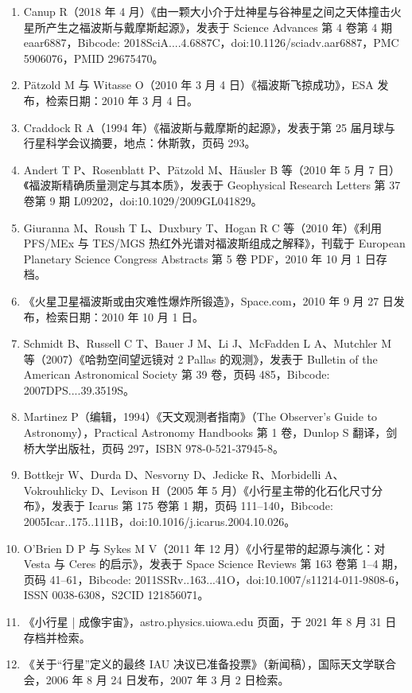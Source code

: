 \begin{enumerate}
\item Canup R（2018 年 4 月）《由一颗大小介于灶神星与谷神星之间之天体撞击火星所产生之福波斯与戴摩斯起源》，发表于 Science Advances 第 4 卷第 4 期 eaar6887，Bibcode: 2018SciA....4.6887C，doi:10.1126/sciadv.aar6887，PMC 5906076，PMID 29675470。
\item Pätzold M 与 Witasse O（2010 年 3 月 4 日）《福波斯飞掠成功》，ESA 发布，检索日期：2010 年 3 月 4 日。
\item Craddock R A（1994 年）《福波斯与戴摩斯的起源》，发表于第 25 届月球与行星科学会议摘要，地点：休斯敦，页码 293。
\item Andert T P、Rosenblatt P、Pätzold M、Häusler B 等（2010 年 5 月 7 日）《福波斯精确质量测定与其本质》，发表于 Geophysical Research Letters 第 37 卷第 9 期 L09202，doi:10.1029/2009GL041829。
\item Giuranna M、Roush T L、Duxbury T、Hogan R C 等（2010 年）《利用 PFS/MEx 与 TES/MGS 热红外光谱对福波斯组成之解释》，刊载于 European Planetary Science Congress Abstracts 第 5 卷 PDF，2010 年 10 月 1 日存档。
\item 《火星卫星福波斯或由灾难性爆炸所锻造》，Space.com，2010 年 9 月 27 日发布，检索日期：2010 年 10 月 1 日。
\item Schmidt B、Russell C T、Bauer J M、Li J、McFadden L A、Mutchler M 等（2007）《哈勃空间望远镜对 2 Pallas 的观测》，发表于 Bulletin of the American Astronomical Society 第 39 卷，页码 485，Bibcode: 2007DPS....39.3519S。
\item Martinez P（编辑，1994）《天文观测者指南》（The Observer's Guide to Astronomy），Practical Astronomy Handbooks 第 1 卷，Dunlop S 翻译，剑桥大学出版社，页码 297，ISBN 978-0-521-37945-8。
\item Bottkejr W、Durda D、Nesvorny D、Jedicke R、Morbidelli A、Vokrouhlicky D、Levison H（2005 年 5 月）《小行星主带的化石化尺寸分布》，发表于 Icarus 第 175 卷第 1 期，页码 111–140，Bibcode: 2005Icar..175..111B，doi:10.1016/j.icarus.2004.10.026。
\item O'Brien D P 与 Sykes M V（2011 年 12 月）《小行星带的起源与演化：对 Vesta 与 Ceres 的启示》，发表于 Space Science Reviews 第 163 卷第 1–4 期，页码 41–61，Bibcode: 2011SSRv..163...41O，doi:10.1007/s11214-011-9808-6，ISSN 0038-6308，S2CID 121856071。
\item 《小行星 | 成像宇宙》，astro.physics.uiowa.edu 页面，于 2021 年 8 月 31 日存档并检索。
\item 《关于“行星”定义的最终 IAU 决议已准备投票》（新闻稿），国际天文学联合会，2006 年 8 月 24 日发布，2007 年 3 月 2 日检索。

\end{enumerate}
